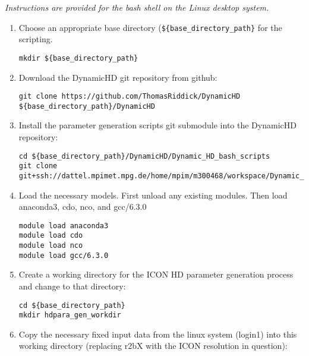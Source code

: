 \documentclass{article}
\begin{document}
\emph{Instructions are provided for the bash shell on the Linux desktop system.}

\begin{enumerate}
\item Choose an appropriate base directory (\lstinline[style=bash_input]|${base_directory_path}| for the scripting.
\begin{lstlisting}[style=bash_input,breaklines=true]
mkdir ${base_directory_path}
\end{lstlisting}
\item Download the DynamicHD git repository from github:
\begin{lstlisting}[style=bash_input,breaklines=true]
git clone https://github.com/ThomasRiddick/DynamicHD ${base_directory_path}/DynamicHD
\end{lstlisting}
\item Install the parameter generation scripts git submodule into the DynamicHD repository:
\begin{lstlisting}[style=bash_input,breaklines=true] 
cd ${base_directory_path}/DynamicHD/Dynamic_HD_bash_scripts
git clone git+ssh://dattel.mpimet.mpg.de/home/mpim/m300468/workspace/Dynamic_HD_Code/Dynamic_HD_bash_scripts/parameter_generation_scripts
\end{lstlisting}

\item Load the necessary models. First unload any existing modules. Then load anaconda3, cdo, nco, and gcc/6.3.0

\begin{lstlisting}[style=bash_input,breaklines=true] 
module load anaconda3
module load cdo
module load nco
module load gcc/6.3.0
\end{lstlisting}


\item Create a working directory for the ICON HD parameter generation process and change to that directory:
\begin{lstlisting}[style=bash_input,breaklines=true] 
cd ${base_directory_path}
mkdir hdpara_gen_workdir
\end{lstlisting}

\item Copy the necessary fixed input data from the linux system (login1) into this working directory (replacing r2bX with the ICON resolution in question):


\end{enumerate}
\end{document}
